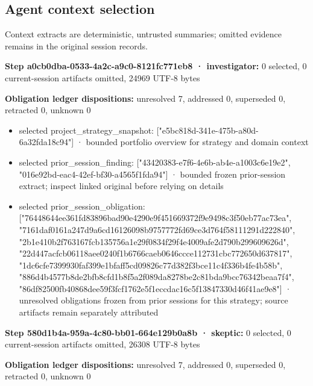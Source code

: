 \documentclass[11pt]{article}
\begin{document}
\subsection{Agent context selection}
Context extracts are deterministic, untrusted summaries; omitted evidence remains in the original session records.\par
\textbf{Step a0cb0dba-0533-4a2c-a9c0-8121fc771eb8 · investigator:} 0 selected, 0 current-session artifacts omitted, 24969 UTF-8 bytes\par
\textbf{Obligation ledger dispositions:} unresolved 7, addressed 0, superseded 0, retracted 0, unknown 0\par
\begin{itemize}
\item selected project\_strategy\_snapshot: ["e5bc818d-341e-475b-a80d-6a32fda18c94"] · bounded portfolio overview for strategy and domain context
\item selected prior\_session\_finding: ["43420383-e7f6-4e6b-ab4e-a1003c6e19e2", "016e92bd-eac4-42ef-bf30-a4565f1fda94"] · bounded frozen prior-session extract; inspect linked original before relying on details
\item selected prior\_session\_obligation: ["76448644ee361fd83896bad90e4290e9f451669372f9e9498c3f50eb77ac73ea", "7161daf0161a247d9a6cd16126098b9757772fd69ce3d764f58111291d222840", "2b1e410b2f763167fcb135756a1e29f0834f29f4e4009afe2d790b299609626d", "22d447acfcb06118aee0240f1b6766caeb0646ccce112731cbc772650d637817", "1dc6cfe7399930faf399e1bfaff5cd09826c77d382f3bce11c4f336b4fe4b58b", "886d4b4577b8de2bfb8cfd1b8f5a2f089da8278be2c81bda9bcc76342beaa7f4", "86df82500fb40868dee59f3fcf1762e5f1eccdac16c5f13847330d46f41ae9e8"] · unresolved obligations frozen from prior sessions for this strategy; source artifacts remain separately attributed
\end{itemize}
\textbf{Step 580d1b4a-959a-4c80-bb01-664e129b0a8b · skeptic:} 0 selected, 0 current-session artifacts omitted, 26308 UTF-8 bytes\par
\textbf{Obligation ledger dispositions:} unresolved 7, addressed 0, superseded 0, retracted 0, unknown 0\par
\end{document}
